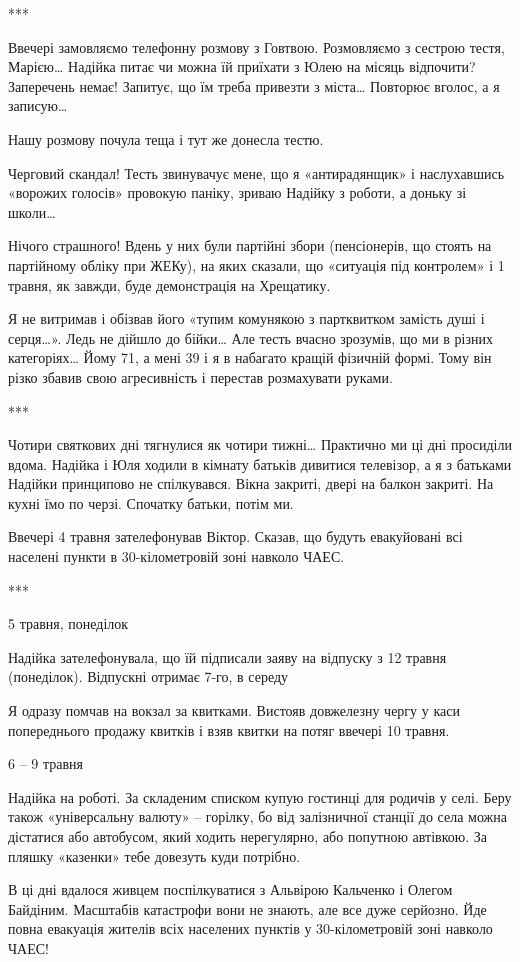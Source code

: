 ***

Ввечері замовляємо телефонну розмову з Говтвою. Розмовляємо з сестрою тестя,
Марією… Надійка питає чи можна їй приїхати з Юлею на місяць відпочити?
Заперечень немає! Запитує, що їм треба привезти з міста… Повторює вголос, а я
записую…

Нашу розмову почула теща і тут же донесла тестю. 

Черговий скандал! Тесть звинувачує мене, що я «антирадянщик» і наслухавшись
«ворожих голосів» провокую паніку, зриваю Надійку з роботи, а доньку зі школи… 

Нічого страшного! Вдень у них були партійні збори (пенсіонерів, що стоять на
партійному обліку при ЖЕКу), на яких сказали, що «ситуація під контролем» і 1
травня, як завжди, буде демонстрація на Хрещатику.

Я не витримав і обізвав його «тупим комунякою з партквитком замість душі і
серця…». Ледь не дійшло до бійки… Але тесть вчасно зрозумів, що ми в різних
категоріях… Йому 71, а мені 39 і я в набагато кращій фізичній формі. Тому він
різко збавив свою агресивність і перестав розмахувати руками. 

***

Чотири святкових дні тягнулися як чотири тижні… Практично ми ці дні просиділи
вдома. Надійка і Юля ходили в кімнату батьків дивитися телевізор, а я з
батьками Надійки принципово не спілкувався. Вікна закриті, двері на балкон
закриті. На кухні їмо по черзі. Спочатку батьки, потім ми.

Ввечері 4 травня зателефонував Віктор. Сказав, що будуть евакуйовані всі
населені пункти в 30-кілометровій зоні навколо ЧАЕС.

***

5 травня, понеділок

Надійка зателефонувала, що їй підписали заяву на відпуску з 12 травня
(понеділок). Відпускні отримає 7-го, в середу

Я одразу помчав на вокзал за квитками. Вистояв довжелезну чергу у каси
попереднього продажу квитків і взяв квитки на потяг ввечері 10 травня. 

6 – 9 травня

Надійка на роботі. За складеним списком купую гостинці для родичів у селі. Беру
також «універсальну валюту» – горілку, бо від залізничної станції до села можна
дістатися або автобусом, який ходить нерегулярно, або попутною автівкою. За
пляшку «казенки» тебе довезуть куди потрібно. 

В ці дні вдалося живцем поспілкуватися з Альвірою Кальченко і Олегом Байдіним.
Масштабів катастрофи вони не знають, але все дуже серйозно. Йде повна евакуація
жителів всіх населених пунктів у 30-кілометровій зоні навколо ЧАЕС!

